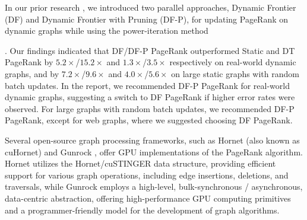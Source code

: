 In our prior research \cite{sahu2024df}, we introduced two parallel approaches, Dynamic Frontier (DF) and Dynamic Frontier with Pruning (DF-P), for updating PageRank on dynamic graphs while using the power-iteration method \cite{rank-page99}. Our findings indicated that DF/DF-P PageRank outperformed Static and DT PageRank by $5.2\times$/$15.2\times$ and $1.3\times$/$3.5\times$ respectively on real-world dynamic graphs, and by $7.2\times$/$9.6\times$ and $4.0\times$/$5.6\times$ on large static graphs with random batch updates. In the report, we recommended DF-P PageRank for real-world dynamic graphs, suggesting a switch to DF PageRank if higher error rates were observed. For large graphs with random batch updates, we recommended DF-P PageRank, except for web graphs, where we suggested choosing DF PageRank.

Several open-source graph processing frameworks, such as Hornet \cite{busato2018hornet} (also known as cuHornet) and Gunrock \cite{wang2016gunrock}, offer GPU implementations of the PageRank algorithm. Hornet utilizes the Hornet/cuSTINGER data structure, providing efficient support for various graph operations, including edge insertions, deletions, and traversals, while Gunrock employs a high-level, bulk-synchronous / asynchronous, data-centric abstraction, offering high-performance GPU computing primitives and a programmer-friendly model for the development of graph algorithms.






